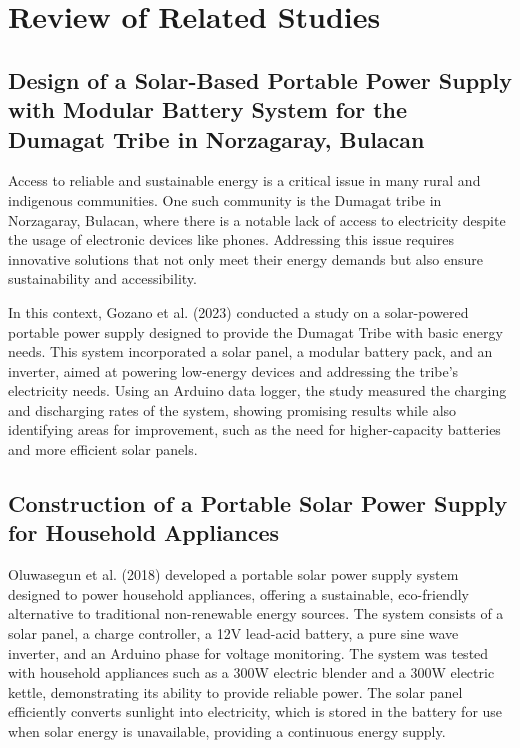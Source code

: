 {\section{Review of Related Studies}

\subsection{Design of a Solar-Based Portable Power Supply with Modular Battery System for the Dumagat Tribe in Norzagaray, Bulacan}

Access to reliable and sustainable energy is a critical issue in many rural and indigenous communities. One such community is the Dumagat tribe in Norzagaray, Bulacan, where there is a notable lack of access to electricity despite the usage of electronic devices like phones. Addressing this issue requires innovative solutions that not only meet their energy demands but also ensure sustainability and accessibility. 

In this context, Gozano et al. (2023) conducted a study on a solar-powered portable power supply designed to provide the Dumagat Tribe with basic energy needs. This system incorporated a solar panel, a modular battery pack, and an inverter, aimed at powering low-energy devices and addressing the tribe’s electricity needs. Using an Arduino data logger, the study measured the charging and discharging rates of the system, showing promising results while also identifying areas for improvement, such as the need for higher-capacity batteries and more efficient solar panels.

\subsection{Construction of a Portable Solar Power Supply for Household Appliances}

Oluwasegun et al. (2018) developed a portable solar power supply system designed to power household appliances, offering a sustainable, eco-friendly alternative to traditional non-renewable energy sources. The system consists of a solar panel, a charge controller, a 12V lead-acid battery, a pure sine wave inverter, and an Arduino phase for voltage monitoring. The system was tested with household appliances such as a 300W electric blender and a 300W electric kettle, demonstrating its ability to provide reliable power. The solar panel efficiently converts sunlight into electricity, which is stored in the battery for use when solar energy is unavailable, providing a continuous energy supply.

}
